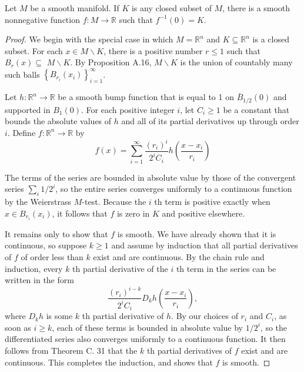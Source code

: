 \documentclass[12pt, oneside]{book}
\begin{document}
\begin{theorem}
    Let $M$ be a smooth manifold. If $K$ is any closed subset of $M$, there is a smooth nonnegative function $f: M \rightarrow \mathbb{R}$ such that $f^{-1}(0)=K$.
    \begin{proof}
        We begin with the special case in which $M=\mathbb{R}^n$ and $K \subseteq \mathbb{R}^n$ is a closed subset. For each $x \in M \backslash K$, there is a positive number $r \leq 1$ such that $B_r(x) \subseteq$ $M \backslash K$. By Proposition A.16, $M \backslash K$ is the union of countably many such balls $\left\{B_{r_i}\left(x_i\right)\right\}_{i=1}^{\infty}$.

        Let $h: \mathbb{R}^n \rightarrow \mathbb{R}$ be a smooth bump function that is equal to 1 on $\bar{B}_{1 / 2}(0)$ and supported in $B_1(0)$. For each positive integer $i$, let $C_i \geq 1$ be a constant that bounds the absolute values of $h$ and all of its partial derivatives up through order $i$. Define $f: \mathbb{R}^n \rightarrow \mathbb{R}$ by
        \begin{equation*}
            f(x)=\sum_{i=1}^{\infty} \frac{\left(r_i\right)^i}{2^i C_i} h\left(\frac{x-x_i}{r_i}\right)
        \end{equation*}

        The terms of the series are bounded in absolute value by those of the convergent series $\sum_i 1 / 2^i$, so the entire series converges uniformly to a continuous function by the Weierstrass $M$-test. Because the $i$ th term is positive exactly when $x \in B_{r_i}\left(x_i\right)$, it follows that $f$ is zero in $K$ and positive elsewhere.

        It remains only to show that $f$ is smooth. We have already shown that it is continuous, so suppose $k \geq 1$ and assume by induction that all partial derivatives of $f$ of order less than $k$ exist and are continuous. By the chain rule and induction, every $k$ th partial derivative of the $i$ th term in the series can be written in the form
        \begin{equation*}
            \frac{\left(r_i\right)^{i-k}}{2^i C_i} D_k h\left(\frac{x-x_i}{r_i}\right),
        \end{equation*}
        where $D_k h$ is some $k$ th partial derivative of $h$. By our choices of $r_i$ and $C_i$, as soon as $i \geq k$, each of these terms is bounded in absolute value by $1 / 2^i$, so the differentiated series also converges uniformly to a continuous function. It then follows from Theorem C. 31 that the $k$ th partial derivatives of $f$ exist and are continuous. This completes the induction, and shows that $f$ is smooth.


\end{proof}
\end{theorem}
\end{document}
